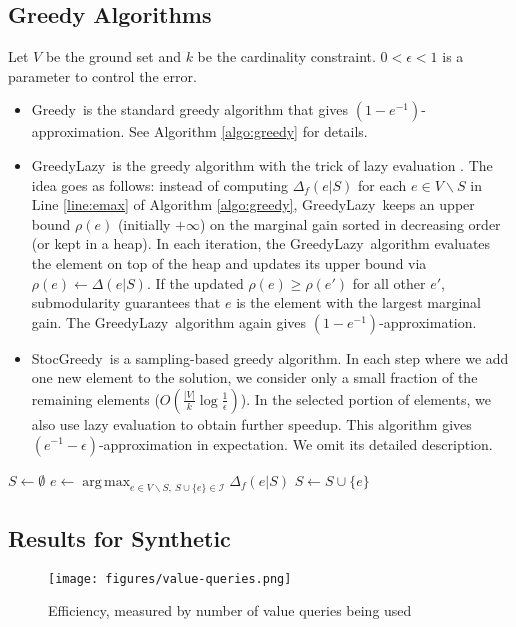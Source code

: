 \documentclass[11pt]{article}
\newcommand{\eps}{\epsilon}
\newcommand{\calI}{\mathcal{I}}
\newcommand{\greedy}{{\sc Greedy}~}
\newcommand{\greedyLazy}{{\sc GreedyLazy}~}
\newcommand{\stocGreedy}{{\sc StocGreedy}~}
\DeclareMathOperator*{\argmax}{arg\,max}
\begin{document}
\subsection{Greedy Algorithms}
Let $V$ be the ground set and $k$ be the cardinality constraint. $ 0 < \eps < 1$ is a parameter to control the error.
\begin{itemize}
\item \greedy is the standard greedy algorithm that gives $(1 - e^{-1})$-approximation.  See Algorithm \ref{algo:greedy} for details.
\item \greedyLazy is the greedy algorithm with the trick of lazy evaluation \cite{M78}. The idea goes as follows: instead of computing $\Delta_f(e|S)$ for each $e\in V\backslash S$ in Line \ref{line:emax} of Algorithm \ref{algo:greedy},  \greedyLazy keeps an upper bound $\rho(e)$ (initially $+\infty$) on the marginal gain sorted in decreasing order (or kept in a heap). In each iteration, the \greedyLazy algorithm evaluates the element on top of the heap and updates its upper bound via $\rho(e) \gets \Delta(e|S)$. If the updated $\rho(e) \geq \rho(e')$ for all other $e'$, submodularity guarantees that $e$ is the element with the largest marginal gain. The \greedyLazy algorithm again gives $(1 - e^{-1})$-approximation.
\item \stocGreedy is a sampling-based greedy algorithm. In each step where we add one new element to the solution, we consider only a small fraction of the remaining elements ($O(\frac{|V|}{k}\log \frac{1}{\eps})$). In the selected portion of elements, we also use lazy evaluation to obtain further speedup. This algorithm gives $(e^{-1} - \eps)$-approximation in expectation. We omit its detailed description.
\end{itemize}

\begin{algorithm}[H]
\DontPrintSemicolon %
$S \gets \emptyset$\;
 {
  $e \gets \argmax_{e\in V\backslash S, ~S\cup\{e\}\in \calI} \Delta_f(e|S)$\;\label{line:emax}
  $S \gets S\cup \{e\}$\;
}
\;
\caption{\greedy for submodular maximization subject to cardinality constraint}
\label{algo:greedy}
\end{algorithm}

\subsection{Results for {\sc Synthetic}}
\begin{figure}[h]
    \centering
    \texttt{[image: figures/value-queries.png]}
    \caption{Efficiency, measured by number of value queries being used}
    \label{fig:greedy-efficiency}
\end{figure}
\end{document}
